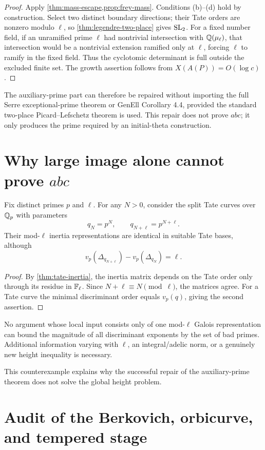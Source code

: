 \begin{proof}
Apply \cref{thm:mass-escape,prop:frey-mass}.  Conditions (b)--(d) hold by construction.  Select two distinct boundary directions; their Tate orders are nonzero modulo $\ell$, so \cref{thm:legendre-two-place} gives $\operatorname{SL}_2$.  For a fixed number field, if an unramified prime $\ell$ had nontrivial intersection with $\mathbb Q(\mu_\ell)$, that intersection would be a nontrivial extension ramified only at $\ell$, forcing $\ell$ to ramify in the fixed field.  Thus the cyclotomic determinant is full outside the excluded finite set.  The growth assertion follows from $X(A(P))=O(\log c)$.
\end{proof}

\begin{audit}
The auxiliary-prime part can therefore be repaired without importing the full Serre exceptional-prime theorem or GenEll Corollary 4.4, provided the standard two-place Picard--Lefschetz theorem is used.  This repair does not prove $abc$; it only produces the prime required by an initial-theta construction.
\end{audit}

\section{Why large image alone cannot prove $abc$}

\begin{counterexample}\label{counter:blindness}
Fix distinct primes $p$ and $\ell$.  For any $N>0$, consider the split Tate curves over $\mathbb Q_p$ with parameters
\[
 q_N=p^N,\qquad q_{N+\ell}=p^{N+\ell}.
\]
Their mod-$\ell$ inertia representations are identical in suitable Tate bases, although
\[
 v_p(\Delta_{q_{N+\ell}})-v_p(\Delta_{q_N})=\ell.
\]
\end{counterexample}

\begin{proof}
By \cref{thm:tate-inertia}, the inertia matrix depends on the Tate order only through its residue in $\mathbb F_\ell$.  Since $N+\ell\equiv N\pmod\ell$, the matrices agree.  For a Tate curve the minimal discriminant order equals $v_p(q)$, giving the second assertion.
\end{proof}

\begin{corollary}
No argument whose local input consists only of one mod-$\ell$ Galois representation can bound the magnitude of all discriminant exponents by the set of bad primes.  Additional information varying with $\ell$, an integral/adelic norm, or a genuinely new height inequality is necessary.
\end{corollary}

This counterexample explains why the successful repair of the auxiliary-prime theorem does not solve the global height problem.

\section{Audit of the Berkovich, orbicurve, and tempered stage}
